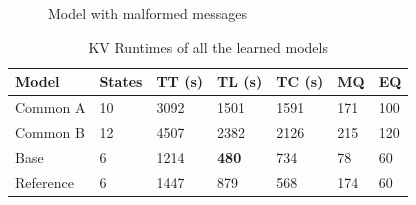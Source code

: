 \begin{figure}[ht]
	\vspace*{\fill}
	\noindent
	\hspace*{-4.5\oddsidemargin}%
	\caption{Model with malformed messages}
	\label{fig:withfilterwitherrors}
	\vspace*{\fill}
\end{figure}

\begin{table}[h]
	\centering
	\begin{tabular}{|l|l|l|l|l|l|l|}
		\hline
		\rowcolor[HTML]{C0C0C0} 
		Model     & States & TT (s)  & TL (s)  & TC (s)  & MQ  & EQ  \\ \hline
		Common A  & 10     & 3092 & 1501 & 1591 & 171 & 100 \\ \hline
		Common B  & 12     & 4507 & 2382 & 2126 & 215 & 120 \\ \hline
		Base      & 6      & 1214 & \textbf{480}  & 734  & 78  & 60  \\ \hline
		Reference & 6      & 1447 & 879  & 568  & 174 & 60  \\ \hline
	\end{tabular}
	\caption{KV Runtimes of all the learned models}
	\label{tab:runtime_summary_kv}
\end{table}
\newpage



